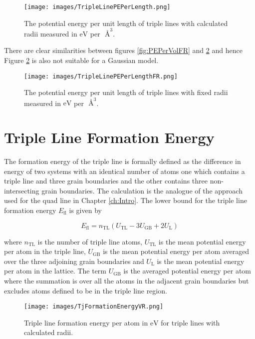 \documentclass[12pt,a4paper,openany]{report}
\newcommand{\ts}[1]{\textrm{#1}}
\begin{document}
\begin{figure}[H]
	\texttt{[image: images/TripleLinePEPerLength.png]}
	\caption{The potential energy per unit length of triple lines with calculated radii measured in $\ts{eV}$ per $\textrm{ \AA}^3$.}	
	\label{fig:PEPerLength} 
\end{figure}

\newpage
There are clear similarities between figures \ref{fig:PEPerVolFR} and \ref{fig:PEPerLengthFR} and hence Figure \ref{fig:PEPerLengthFR} is also not suitable for a Gaussian model.


\begin{figure}[H]
\texttt{[image: images/TripleLinePEPerLengthFR.png]}  
	\caption{The potential energy per unit length of triple lines with fixed radii measured in $\ts{eV}$ per $\textrm{ \AA}^3$.}	
	\label{fig:PEPerLengthFR} 
\end{figure}


\newpage


\section{Triple Line Formation Energy} \label{sec:TLFE}


The formation energy of the triple line is formally defined as the difference in energy of two systems with an identical number of atoms one which contains a triple line and three grain boundaries and the other contains three non-intersecting grain boundaries. The calculation is the analogue of the approach used for the quad line in Chapter \ref{ch:Intro}. The lower bound for the triple line formation energy $E_{\ts{fl}}$ is given by

\[ E_{\ts{fl}} = n_{\ts{TL}}\left(U_{\ts{TL}} -3U_{\ts{GB}} + 2U_{\ts{L}} \right) \]
 
where $n_{\ts{TL}}$ is the number of triple line atoms, $U_{\ts{TL}}$ is the mean potential energy per atom in the triple line,  $U_{\ts{GB}}$ is the mean potential energy per atom averaged over the three adjoining grain boundaries and $U_{\ts{L}}$ is the mean potential energy per atom in the lattice. The term $U_{\ts{GB}}$ is the averaged potential energy per atom where the summation is over all the atoms in the adjacent grain boundaries but excludes atoms defined to be in the triple line region.
  

\begin{figure}[H]
	\texttt{[image: images/TjFormationEnergyVR.png]} 
	\caption{Triple line formation energy per atom in $\ts{eV}$ for triple lines with calculated radii.}
	\label{fig:FormationEnergyVR}
\end{figure}
\end{document}
